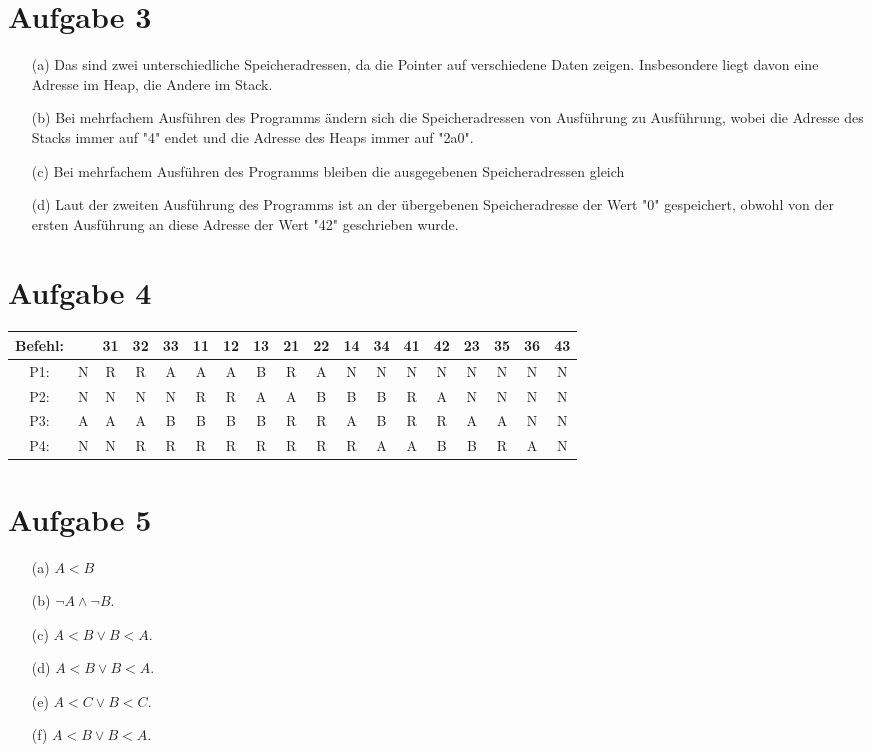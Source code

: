 \documentclass[12pt,a4paper,oneside,ngerman]{article}
\begin{document}
\section*{Aufgabe 3}
\begin{enumerate}
	\item[(a)] Das sind zwei unterschiedliche Speicheradressen, da die Pointer auf verschiedene Daten zeigen. Insbesondere liegt davon eine Adresse im Heap, die Andere im Stack.
	
	\item[(b)] Bei mehrfachem Ausführen des Programms ändern sich die Speicheradressen von Ausführung zu Ausführung, wobei die Adresse des Stacks immer auf "4" endet und die Adresse des Heaps immer auf "2a0".
	
	\item [(c)] Bei mehrfachem Ausführen des Programms bleiben die ausgegebenen Speicheradressen gleich
	
	\item[(d)] Laut der zweiten Ausführung des Programms ist an der übergebenen Speicheradresse der Wert "0" gespeichert, obwohl von der ersten Ausführung an diese Adresse der Wert "42" geschrieben wurde.
\end{enumerate}

\section*{Aufgabe 4}
\begin{center}
	\begin{tabular}{ |c|c|c|c|c|c|c|c|c|c|c|c|c|c|c|c|c|c| }
		\hline
		Befehl: & & 31 & 32 & 33 & 11 & 12 & 13 & 21 & 22 & 14 & 34 & 41 & 42 & 23 & 35 & 36 & 43 \\
		\hline
		P1: & N & R & R & A & A & A & B & R & A & N & N & N & N & N & N & N & N \\  
		P2: & N & N & N & N & R & R & A & A & B & B & B & R & A & N & N & N & N \\
		P3: & A & A & A & B & B & B & B & R & R & A & B & R & R & A & A & N & N \\
		P4: & N & N & R & R & R & R & R & R & R & R & A & A & B & B & R & A & N \\
		\hline
	\end{tabular}
\end{center}

\section*{Aufgabe 5}
\begin{enumerate}
	\item[(a)] $A<B$
	\item[(b)] $\neg A\wedge\neg B$.
	\item[(c)] $A<B \vee B<A$.
	\item[(d)] $A<B \vee B<A$.
	\item[(e)] $A<C \vee B<C$.
	\item[(f)] $A<B \vee B<A$.
\end{enumerate}
\end{document}
